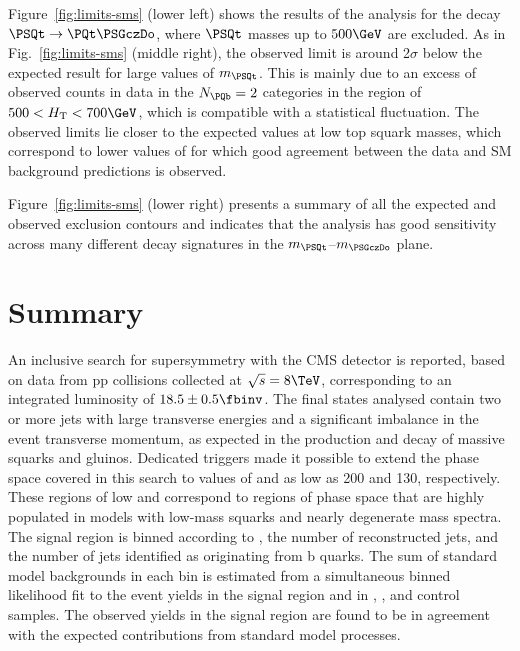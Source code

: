 Figure~\ref{fig:limits-sms} (lower left) shows the results of the
analysis for the decay $\PSQt \to \PQt \PSGczDo$,
where $\PSQt$ masses up to $500 \GeV$ are excluded.  As in
Fig.~\ref{fig:limits-sms} (middle right), the observed limit is around
2$\sigma$ below the expected result for large values of
$m_{\PSQt}$. This is mainly due to an excess of observed counts in
data in the $\nb=2$ categories in the region of $500 < \scalht < 700
\GeV$, which is compatible with a statistical fluctuation.  The
observed limits lie closer to the expected values at low top squark
masses, which correspond to lower values of \scalht for which good
agreement between the data and SM background predictions is observed.

Figure~\ref{fig:limits-sms} (lower right) presents a summary of all
the expected and observed exclusion contours and indicates that the
analysis has good sensitivity across many different decay signatures
in the $m_{\PSQt}$--$m_{\PSGczDo}$ plane.


\section{Summary}

An inclusive search for supersymmetry with the CMS detector is
reported, based on data from pp collisions collected at $\sqrt{s} =
8\TeV$, corresponding to an integrated luminosity of $18.5 \pm 0.5
\fbinv$. The final states analysed contain two or more jets with large
transverse energies
and a significant imbalance in the event transverse momentum, as
expected in the production and decay of massive squarks and
gluinos. Dedicated triggers made it possible to extend the phase space
covered in this search to values of \scalht and \HTmiss as low as 200
and 130\GeV, respectively.
These regions of low \scalht and
\HTmiss correspond to regions of phase space that are highly populated
in models with low-mass squarks and nearly degenerate mass
spectra. The signal region is binned according to \scalht, the number
of reconstructed jets, and the number of jets identified as
originating from b quarks. The sum of standard model backgrounds in
each bin is estimated from a simultaneous binned likelihood fit to the
event yields in the signal region and in \mj, \mmj, and \gj control
samples. The observed yields in the signal region are found to be in
agreement with the expected contributions from standard model
processes.

